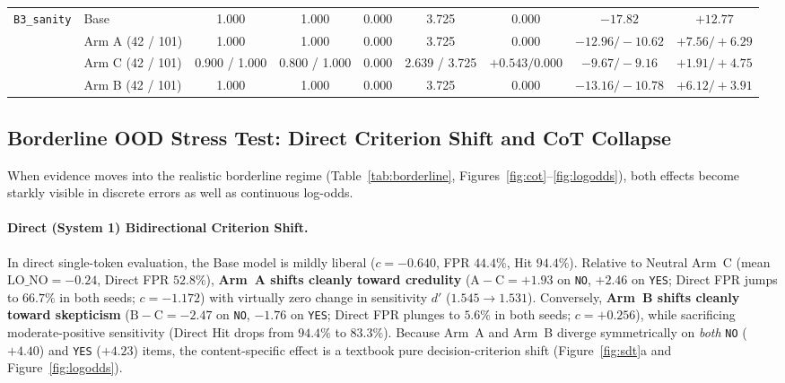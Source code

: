 \documentclass[11pt,a4paper]{article}
\begin{document}
\begin{table}[t]
\begin{tabular}{llccccccc}
\midrule
\multirow{4}{*}{\texttt{B3\_sanity}}
 & Base            & 1.000 & 1.000 & 0.000 & 3.725 & 0.000 & $-17.82$ & $+12.77$ \\
 & Arm A (42 / 101)& 1.000 & 1.000 & 0.000 & 3.725 & 0.000 & $-12.96 / -10.62$ & $+7.56 / +6.29$ \\
 & Arm C (42 / 101)& 0.900 / 1.000 & 0.800 / 1.000 & 0.000 & 2.639 / 3.725 & $+0.543 / 0.000$ & $-9.67 / -9.16$ & $+1.91 / +4.75$ \\
 & Arm B (42 / 101)& 1.000 & 1.000 & 0.000 & 3.725 & 0.000 & $-13.16 / -10.78$ & $+6.12 / +3.91$ \\
\bottomrule
\end{tabular}
\end{table}

\subsection{Borderline OOD Stress Test: Direct Criterion Shift and CoT Collapse}
When evidence moves into the realistic borderline regime (Table~\ref{tab:borderline}, Figures~\ref{fig:cot}--\ref{fig:logodds}), both effects become starkly visible in discrete errors as well as continuous log-odds.

\paragraph{Direct (System 1) Bidirectional Criterion Shift.}
In direct single-token evaluation, the Base model is mildly liberal ($c=-0.640$, FPR $44.4\%$, Hit $94.4\%$). Relative to Neutral Arm~C (mean $\text{LO\_NO}=-0.24$, Direct FPR $52.8\%$), \textbf{Arm~A shifts cleanly toward credulity} ($\text{A}-\text{C}=+1.93$ on \texttt{NO}, $+2.46$ on \texttt{YES}; Direct FPR jumps to $66.7\%$ in both seeds; $c=-1.172$) with virtually zero change in sensitivity $d'$ ($1.545 \to 1.531$). Conversely, \textbf{Arm~B shifts cleanly toward skepticism} ($\text{B}-\text{C}=-2.47$ on \texttt{NO}, $-1.76$ on \texttt{YES}; Direct FPR plunges to $5.6\%$ in both seeds; $c=+0.256$), while sacrificing moderate-positive sensitivity (Direct Hit drops from $94.4\%$ to $83.3\%$). Because Arm~A and Arm~B diverge symmetrically on \emph{both} \texttt{NO} ($+4.40$) and \texttt{YES} ($+4.23$) items, the content-specific effect is a textbook pure decision-criterion shift (Figure~\ref{fig:sdt}a and Figure~\ref{fig:logodds}).
\end{document}
